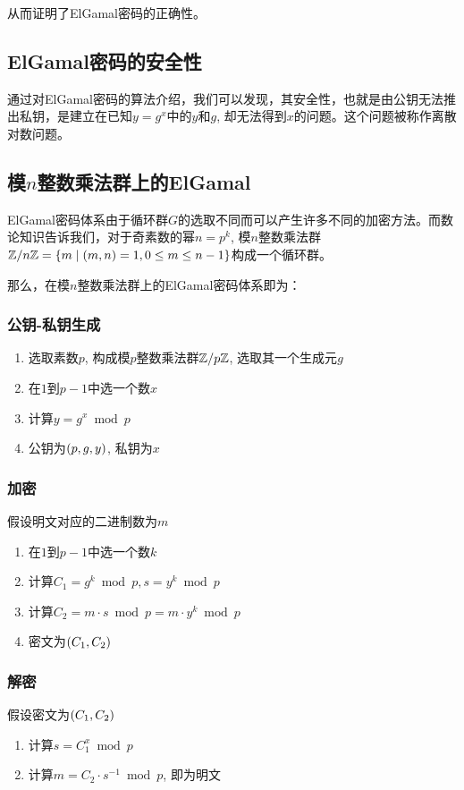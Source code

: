从而证明了ElGamal密码的正确性。
\subsection{ElGamal密码的安全性}
通过对ElGamal密码的算法介绍，我们可以发现，其安全性，也就是由公钥无法推出私钥，是建立在已知$y=g^x$中的$y$和$g$, 却无法得到$x$的问题。这个问题被称作离散对数问题。
\subsection{模$n$整数乘法群上的ElGamal}
ElGamal密码体系由于循环群$G$的选取不同而可以产生许多不同的加密方法。而数论知识告诉我们，对于奇素数的幂$n=p^k$, 模$n$整数乘法群$\mathbb{Z}/n\mathbb{Z}=\{m\mid\left( {m, n}\right)=1, 0\leq m\leq n-1\}$构成一个循环群。\par
那么，在模$n$整数乘法群上的ElGamal密码体系即为：
\subsubsection{公钥-私钥生成}
\begin{enumerate}
	\item 选取素数$p$, 构成模$p$整数乘法群$\mathbb{Z}/p\mathbb{Z}$, 选取其一个生成元$g$
	\item 在$1$到$p-1$中选一个数$x$
	\item 计算$y=g^x\bmod{p}$
	\item 公钥为$\left( {p, g, y}\right)$, 私钥为$x$
\end{enumerate}
\subsubsection{加密}
假设明文对应的二进制数为$m$
\begin{enumerate}
	\item 在$1$到$p-1$中选一个数$k$
	\item 计算$C_1=g^k\bmod{p}, s=y^k\bmod{p}$
	\item 计算$C_2=m\cdot s\bmod{p}=m\cdot y^k\bmod{p}$
	\item 密文为$\left( {C_1, C_2}\right)$
\end{enumerate}
\subsubsection{解密}
假设密文为$\left( {C_1, C_2}\right)$
\begin{enumerate}
	\item 计算$s=C_1^x\bmod{p}$
	\item 计算$m=C_2\cdot s^{-1}\bmod{p}$, 即为明文
\end{enumerate}

